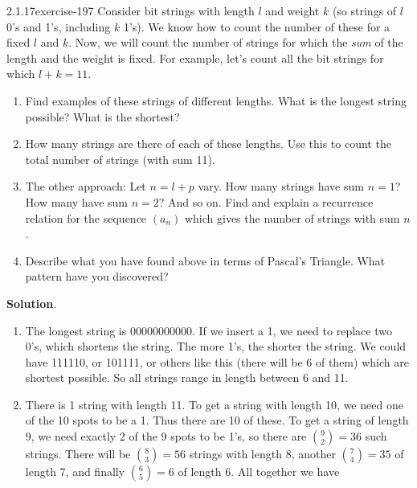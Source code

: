 \documentclass[twoside,11pt,]{book}
\numberwithin{equation}{chapter}
\begin{document}
\begin{divisionsolution}{2.1.17}{}{exercise-197}%
\hypertarget{p-3050}{}%
Consider bit strings with length \(l\) and weight \(k\) (so strings of \(l\) 0's and 1's, including \(k\) 1's). We know how to count the number of these for a fixed \(l\) and \(k\). Now, we will count the number of strings for which the \emph{sum} of the length and the weight is fixed. For example, let's count all the bit strings for which \(l+k = 11\).\leavevmode%
\begin{enumerate}[label=(\alph*)]
\item\hypertarget{li-1801}{}\hypertarget{p-3051}{}%
Find examples of these strings of different lengths. What is the longest string possible? What is the shortest?%
\item\hypertarget{li-1802}{}\hypertarget{p-3052}{}%
How many strings are there of each of these lengths. Use this to count the total number of strings (with sum 11).%
\item\hypertarget{li-1803}{}\hypertarget{p-3053}{}%
The other approach: Let \(n = l+p\) vary. How many strings have sum \(n = 1\)? How many have sum \(n = 2\)? And so on. Find and explain a recurrence relation for the sequence \((a_n)\) which gives the number of strings with sum \(n\).%
\item\hypertarget{li-1804}{}\hypertarget{p-3054}{}%
Describe what you have found above in terms of Pascal's Triangle. What pattern have you discovered?%
\end{enumerate}
%
\par\smallskip%
\noindent\textbf{Solution}.\quad%
\hypertarget{p-3055}{}%
\leavevmode%
\begin{enumerate}[label=(\alph*)]
\item\hypertarget{li-1805}{}\hypertarget{p-3056}{}%
The longest string is 00000000000. If we insert a 1, we need to replace two 0's, which shortens the string. The more 1's, the shorter the string. We could have 111110, or 101111, or others like this (there will be 6 of them) which are shortest possible. So all strings range in length between 6 and 11.%
\item\hypertarget{li-1806}{}\hypertarget{p-3057}{}%
There is 1 string with length 11. To get a string with length 10, we need one of the 10 spots to be a 1. Thus there are 10 of these. To get a string of length 9, we need exactly 2 of the 9 spots to be 1's, so there are \({9 \choose 2} = 36\) such strings. There will be \({8 \choose 3} = 56\) strings with length 8, another \({7 \choose 4} = 35\) of length 7, and finally \({6 \choose 5} = 6\) of length 6. All together we have%

\end{enumerate}
\end{divisionsolution}
\end{document}
